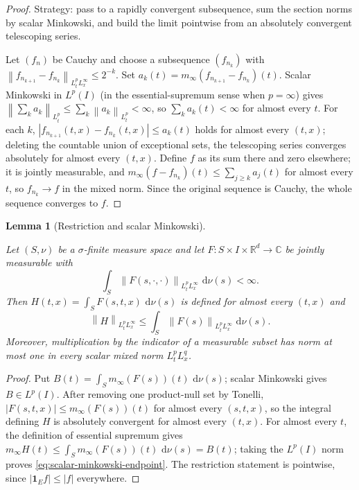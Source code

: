 \documentclass[11pt,oneside]{book}
\providecommand{\uses}[1]{}
\newtheorem{lemma}[theorem]{Lemma}
\theoremstyle{definition}
\theoremstyle{remark}
\newcommand{\R}{\mathbb R}
\newcommand{\C}{\mathbb C}
\newcommand{\1}{\mathbf 1}
\newcommand{\dd}{\,\mathrm d}
\newcommand{\norm}[1]{\left\lVert #1\right\rVert}
\newcommand{\abs}[1]{\left\lvert #1\right\rvert}
\begin{document}
\begin{proof}
\uses{def:scalar-mixed-norm}
Strategy: pass to a rapidly convergent subsequence, sum the section norms by scalar Minkowski, and build the limit pointwise from an absolutely convergent telescoping series.

Let $(f_n)$ be Cauchy and choose a subsequence $(f_{n_k})$ with $\norm{f_{n_{k+1}}-f_{n_k}}_{L^p_tL^\infty_x}\le2^{-k}$. Set $a_k(t)=m_\infty(f_{n_{k+1}}-f_{n_k})(t)$. Scalar Minkowski in $L^p(I)$ (in the essential-supremum sense when $p=\infty$) gives $\norm{\sum_k a_k}_{L^p_t}\le\sum_k\norm{a_k}_{L^p_t}<\infty$, so $\sum_k a_k(t)<\infty$ for almost every $t$. For each $k$, $\abs{f_{n_{k+1}}(t,x)-f_{n_k}(t,x)}\le a_k(t)$ holds for almost every $(t,x)$; deleting the countable union of exceptional sets, the telescoping series converges absolutely for almost every $(t,x)$. Define $f$ as its sum there and zero elsewhere; it is jointly measurable, and $m_\infty(f-f_{n_k})(t)\le\sum_{j\ge k}a_j(t)$ for almost every $t$, so $f_{n_k}\to f$ in the mixed norm. Since the original sequence is Cauchy, the whole sequence converges to $f$.
\end{proof}

\begin{lemma}[Restriction and scalar Minkowski]\label{lem:scalar-mixed-minkowski}
\uses{def:scalar-mixed-norm}
Let $(S,\nu)$ be a $\sigma$-finite measure space and let $F:S\times I\times\R^d\to\C$ be jointly measurable with
\[
 \int_S\norm{F(s,\cdot,\cdot)}_{L^p_tL^\infty_x}\,\dd\nu(s)<\infty .
\]
Then $H(t,x)=\int_S F(s,t,x)\,\dd\nu(s)$ is defined for almost every $(t,x)$ and
\begin{equation}
 \norm{H}_{L^p_tL^\infty_x}\le\int_S\norm{F(s)}_{L^p_tL^\infty_x}\,\dd\nu(s).
 \label{eq:scalar-minkowski-endpoint}
\end{equation}
Moreover, multiplication by the indicator of a measurable subset has norm at most one in every scalar mixed norm $L^p_tL^q_x$.
\end{lemma}

\begin{proof}
\uses{def:scalar-mixed-norm, lem:measurable-esssup-section}
Put $B(t)=\int_S m_\infty(F(s))(t)\,\dd\nu(s)$; scalar Minkowski gives $B\in L^p(I)$. After removing one product-null set by Tonelli, $\abs{F(s,t,x)}\le m_\infty(F(s))(t)$ for almost every $(s,t,x)$, so the integral defining $H$ is absolutely convergent for almost every $(t,x)$. For almost every $t$, the definition of essential supremum gives $m_\infty H(t)\le\int_S m_\infty(F(s))(t)\,\dd\nu(s)=B(t)$; taking the $L^p(I)$ norm proves \eqref{eq:scalar-minkowski-endpoint}. The restriction statement is pointwise, since $\abs{\1_E f}\le\abs{f}$ everywhere.
\end{proof}
\end{document}

